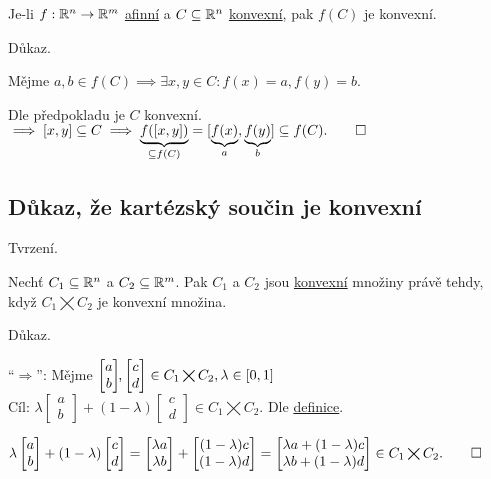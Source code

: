 Je-li $f: \mathbb{R}^n \rightarrow \mathbb{R}^m$ \hyperref[sec:afin]{afinní} a $C \subseteq \mathbb{R}^n$ \hyperref[sec:konvex]{konvexní}, pak
$f(C)$ je konvexní.

Důkaz.

Mějme $a, b \in f(C) \implies \exists x, y \in C: f(x)=a, f(y)=b$.

Dle předpokladu je $C$ konvexní. $\implies [x, y] \subseteq C \implies \underbrace{f([x, y])}_{\subseteq f(C)} =
[\underbrace{f(x)}_a, \underbrace{f(y)}_b] \subseteq f(C). \qed$

\subsection{Důkaz, že kartézský součin je konvexní}
Tvrzení.

Nechť $C_1 \subseteq \mathbb{R}^n$ a $C_2 \subseteq \mathbb{R}^m$. Pak $C_1$ a $C_2$ jsou \hyperref[sec:konvex]{konvexní} množiny právě 
tehdy, když $C_1 \bigtimes C_2$ je konvexní množina.

Důkaz.

\enquote{$\Rightarrow$}: Mějme
$
\begin{bmatrix}
    a \\
    b
\end{bmatrix}\hspace{-1mm}\text{,}
\begin{bmatrix}
    c \\
    d
\end{bmatrix} \in C_1 \bigtimes C_2, \lambda \in [0,1]$\\
Cíl:
$
\lambda \begin{bmatrix}
    a \\
    b
\end{bmatrix}
+ (1-\lambda)
\begin{bmatrix}
    c \\
    d
\end{bmatrix} \in C_1 \bigtimes C_2.$ Dle \hyperref[sec:konvex]{definice}.

$
\lambda \begin{bmatrix}
    a \\
    b
\end{bmatrix}
+ (1-\lambda)
\begin{bmatrix}
    c \\
    d
\end{bmatrix} =
\begin{bmatrix}
    \lambda a \\
    \lambda b
\end{bmatrix}
+
\begin{bmatrix}
    (1-\lambda)c \\
    (1-\lambda)d
\end{bmatrix}
=
\begin{bmatrix} %
    \lambda a + (1-\lambda)c \\
    \lambda b + (1-\lambda)d
\end{bmatrix} \in C_1 \bigtimes C_2. \qed$

